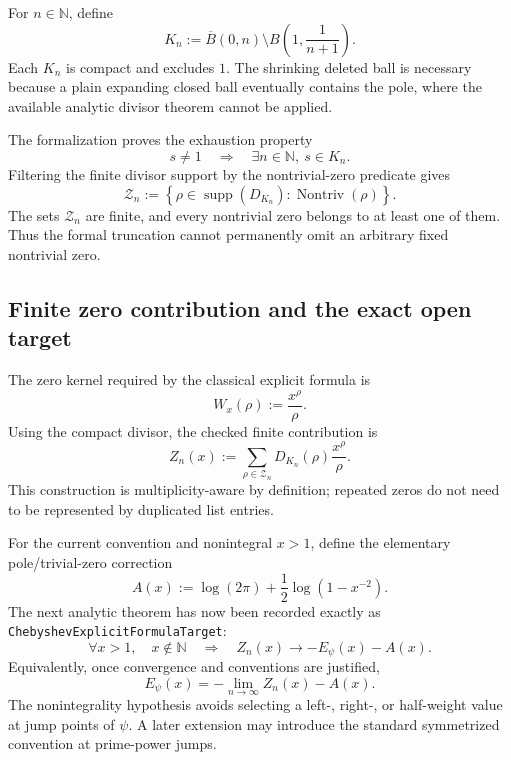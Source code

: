 \documentclass[11pt,a4paper]{article}
\newcommand{\code}[1]{\texttt{#1}}
\begin{document}
For $n\in\mathbb N$, define
\begin{equation}
  K_n:=\overline{B}(0,n)
       \setminus B\!\left(1,\frac{1}{n+1}\right).
  \label{eq:zeta-truncation-region}
\end{equation}
Each $K_n$ is compact and excludes $1$. The shrinking deleted ball is necessary
because a plain expanding closed ball eventually contains the pole, where the
available analytic divisor theorem cannot be applied.

The formalization proves the exhaustion property
\begin{equation}
  s\neq 1
  \quad\Longrightarrow\quad
  \exists n\in\mathbb N,\ s\in K_n.
  \label{eq:truncation-exhaustion}
\end{equation}
Filtering the finite divisor support by the nontrivial-zero predicate gives
\[
  \mathcal Z_n
  :=\left\{\rho\in\operatorname{supp}(D_{K_n}):
      \operatorname{Nontriv}(\rho)\right\}.
\]
The sets $\mathcal Z_n$ are finite, and every nontrivial zero belongs to at
least one of them. Thus the formal truncation cannot permanently omit an
arbitrary fixed nontrivial zero.

\subsection{Finite zero contribution and the exact open target}

The zero kernel required by the classical explicit formula is
\[
  W_x(\rho):=\frac{x^{\rho}}{\rho}.
\]
Using the compact divisor, the checked finite contribution is
\begin{equation}
  Z_n(x)
  :=\sum_{\rho\in\mathcal Z_n}
      D_{K_n}(\rho)\frac{x^{\rho}}{\rho}.
  \label{eq:finite-zero-contribution}
\end{equation}
This construction is multiplicity-aware by definition; repeated zeros do not
need to be represented by duplicated list entries.

For the current convention and nonintegral $x>1$, define the elementary
pole/trivial-zero correction
\begin{equation}
  A(x):=\log(2\pi)
  +\frac12\log\!\left(1-x^{-2}\right).
  \label{eq:archimedean-correction}
\end{equation}
The next analytic theorem has now been recorded exactly as
\code{ChebyshevExplicitFormulaTarget}:
\begin{equation}
  \forall x>1,\quad x\notin\mathbb N
  \quad\Longrightarrow\quad
  Z_n(x)\longrightarrow -E_{\psi}(x)-A(x).
  \label{eq:explicit-formula-target}
\end{equation}
Equivalently, once convergence and conventions are justified,
\[
  E_{\psi}(x)
  =-\lim_{n\to\infty}Z_n(x)-A(x).
\]
The nonintegrality hypothesis avoids selecting a left-, right-, or half-weight
value at jump points of $\psi$. A later extension may introduce the standard
symmetrized convention at prime-power jumps.
\end{document}
